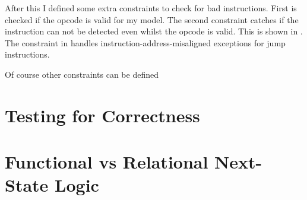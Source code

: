 After this I defined some extra constraints to check for bad instructions.
First is checked if the opcode is valid for my model. The second constraint
catches if the instruction can not be detected even whilst the opcode is valid.
This is shown in . The constraint in
 handles instruction-address-misaligned exceptions for
jump instructions.

Of course other constraints can be defined





\section{Testing for Correctness}\label{sec:corectness}

\section{Functional vs Relational Next-State Logic}\label{sec:funcVSrel}